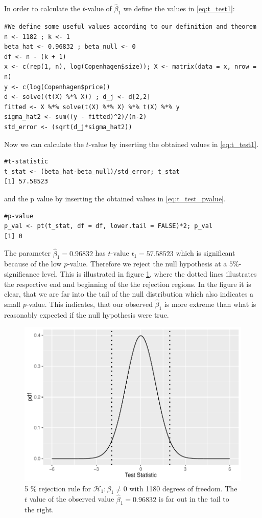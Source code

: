 In order to calculate the $t$-value of $\hat{\beta}_1$ we define the values in \eqref{eq:t_test1}:
\begin{lstlisting}
#We define some useful values according to our definition and theorem
n <- 1182 ; k <- 1
beta_hat <- 0.96832 ; beta_null <- 0
df <- n - (k + 1)
x <- c(rep(1, n), log(Copenhagen$size)); X <- matrix(data = x, nrow = n)
y <- c(log(Copenhagen$price))
d <- solve((t(X) %*% X)) ; d_j <- d[2,2]
fitted <- X %*% solve(t(X) %*% X) %*% t(X) %*% y
sigma_hat2 <- sum((y - fitted)^2)/(n-2)
std_error <- (sqrt(d_j*sigma_hat2))
\end{lstlisting}
Now we can calculate the $t$-value by inserting the obtained values in \eqref{eq:t_test1}.
\begin{lstlisting}
#t-statistic
t_stat <- (beta_hat-beta_null)/std_error; t_stat
[1] 57.58523
\end{lstlisting}
and the p value by inserting the obtained values in \eqref{eq:t_test_pvalue}.
\begin{lstlisting}
#p-value
p_val <- pt(t_stat, df = df, lower.tail = FALSE)*2; p_val
[1] 0
\end{lstlisting}
The parameter $\hat{\beta}_1=0.96832$ has $t$-value $t_1 = 57.58523$ which is significant because of the low $p$-value. 
Therefore we reject the null hypothesis at a $5\%$-significance level. 
This is illustrated in figure \ref{fig:t_distributionplot1}, where the dotted lines illustrates the respective end and beginning of the the rejection regions.
In the figure it is clear, that we are far into the tail of the null distribution which also indicates a small $p$-value. 
This indicates, that our observed $\hat{\beta}_1$ is more extreme than what is reasonably expected if the null hypothesis were true.
\begin{figure}[H]
    \centering
    \includegraphics[width = 0.6  \textwidth]{figures/Nanna/t_distribution123.pdf}
    \caption{5 \% rejection rule for $\mathcal{H}_1:\beta_1\neq0$ with 1180 degrees of freedom. The $t$ value of the observed value $\hat{\beta}_1=0.96832$ is far out in the tail to the right.}
    \label{fig:t_distributionplot1}
\end{figure}
